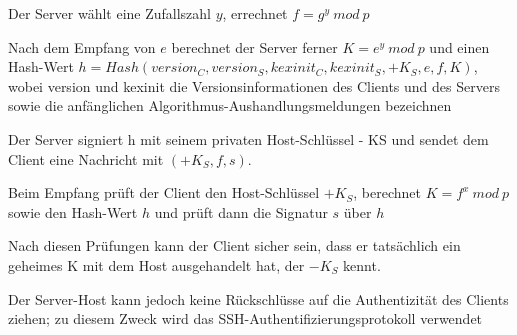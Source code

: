 \documentclass[a4paper]{article}
\begin{document}
\begin{multicols}{3}
\begin{itemize*}
\begin{itemize*}
                  \item Der Server wählt eine Zufallszahl $y$, errechnet $f=g^y\ mod\ p$
                  \item Nach dem Empfang von $e$ berechnet der Server ferner $K=e^y\ mod\ p$ und einen Hash-Wert $h = Hash(version_C, version_S, kexinit_C, kexinit_S, +K_S, e, f, K)$, wobei version und kexinit die Versionsinformationen des Clients und des Servers sowie die anfänglichen Algorithmus-Aushandlungsmeldungen bezeichnen
                  \item Der Server signiert h mit seinem privaten Host-Schlüssel - KS und sendet dem Client eine Nachricht mit $(+K_S, f, s)$.
                  \item Beim Empfang prüft der Client den Host-Schlüssel $+K_S$, berechnet $K=f^x\ mod\ p$ sowie den Hash-Wert $h$ und prüft dann die Signatur $s$ über $h$
            \end{itemize*}
            \item Nach diesen Prüfungen kann der Client sicher sein, dass er tatsächlich ein geheimes K mit dem Host ausgehandelt hat, der $-K_S$ kennt.
            \item Der Server-Host kann jedoch keine Rückschlüsse auf die Authentizität des Clients ziehen; zu diesem Zweck wird das SSH-Authentifizierungsprotokoll verwendet
      \end{itemize*}


\end{multicols}
\end{document}
